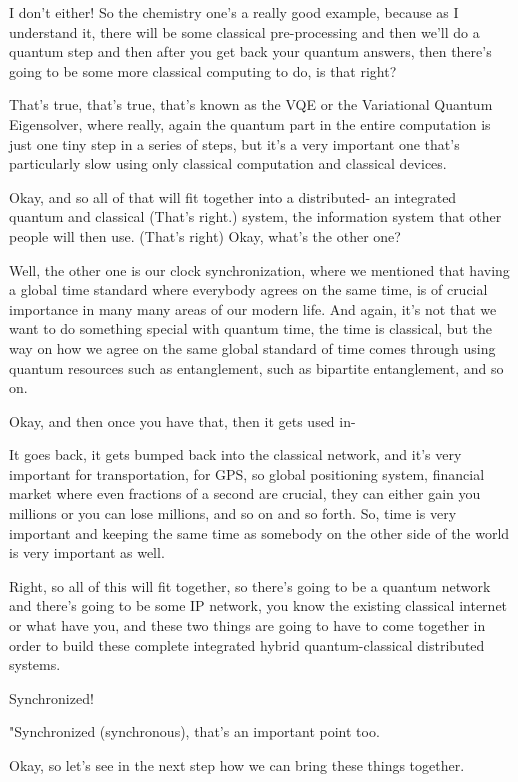 I don't either! So the chemistry one's a really good example, because as I understand it, there will be some classical pre-processing and then we'll do a quantum step and then after you get back your quantum answers, then there's going to be some more classical computing to do, is that right?

That's true, that's true, that's known as the VQE or the Variational Quantum Eigensolver, where really, again the quantum part in the entire computation is just one tiny step in a series of steps, but it's a very important one that's particularly slow using only classical computation and classical devices.

Okay, and so all of that will fit together into a distributed- an integrated quantum and classical (That's right.) system, the information system that other people will then use. (That's right) Okay, what's the other one?

Well, the other one is our clock synchronization, where we mentioned that having a global time standard where everybody agrees on the same time, is of crucial importance in many many areas of our modern life. And again, it's not that we want to do something special with quantum time, the time is classical, but the way on how we agree on the same global standard of time comes through using quantum resources such as entanglement, such as bipartite entanglement, and so on.

Okay, and then once you have that, then it gets used in-

It goes back, it gets bumped back into the classical network, and it's very important for transportation, for GPS, so global positioning system, financial market where even fractions of a second are crucial, they can either gain you millions or you can lose millions, and so on and so forth. So, time is very important and keeping the same time as somebody on the other side of the world is very important as well.

Right, so all of this will fit together, so there's going to be a quantum network and there's going to be some IP network, you know the existing classical internet or what have you, and these two things are going to have to come together in order to build these complete integrated hybrid quantum-classical distributed systems.

Synchronized!

"Synchronized (synchronous), that's an important point too.

Okay, so let's see in the next step how we can bring these things together.

